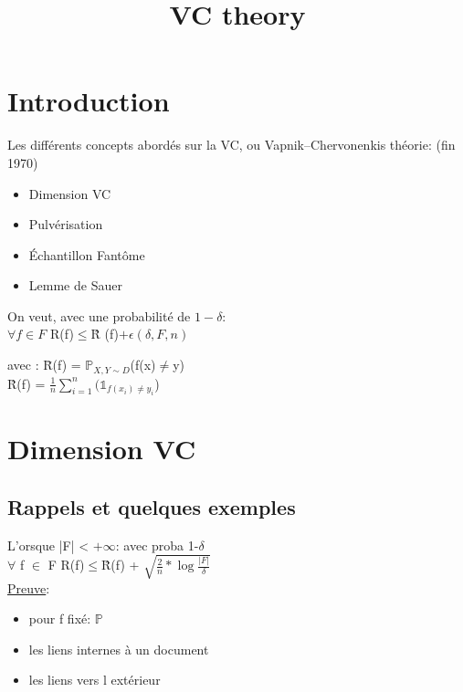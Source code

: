\documentclass[a4paper]{report}
\title{VC theory}
\begin{document}
\maketitle
\tableofcontents

\renewcommand{\thesection}{\arabic{section}}



\chapter*{Introduction}
Les différents concepts abordés sur la VC, ou Vapnik–Chervonenkis théorie: (fin 1970)
\begin{itemize}
\item Dimension VC
\item Pulvérisation
\item Échantillon Fantôme
\item Lemme de Sauer
\end{itemize}
On veut, avec une probabilité de $1 - \delta$:\\
$ \forall f \in F $ R(f)$ \leq $\^R (f)$ + \epsilon(\delta, F, n) $\\
\begin{tabbing}
avec : \= R(f) = $\mathds{P}_{X,Y \sim D}$(f(x)$\neq$y)\\
\> \^R(f) = $\frac{1}{n}\displaystyle { \sum_{i=1}^{n}}( \mathds{1}_{f(x_i)\neq y_i} $)\\
\end{tabbing}

\chapter*{Dimension VC}

\section{Rappels et quelques exemples}
L'orsque |F| < $ +\infty $: avec proba 1-$ \delta $\\
$ \forall $ f $ \in $ F R(f)$ \leq $\^R(f) + $\sqrt{\frac{2}{n}*\log\frac{|F|}{\delta}}$\\
\newline
\underline{Preuve}:\\
\begin{itemize}
\item pour f fixé: $\mathds{P}$
\item les liens internes à un document
\item les liens vers l extérieur
\end{itemize}
\end{document}

